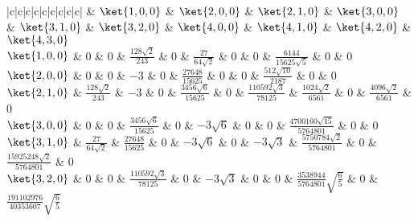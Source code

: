 

\begin{table}[ht]
\centering
\caption{$\mel{\psi_{n',l',m'}}{z}{\psi_{n,l,m}}$}\label{HDipM_tab1}
\begin{tabular}{|c|c|c|c|c|c|c|c|c|}
\hline
& $\ket{1,0,0}$ & $\ket{2,0,0}$ & $\ket{2,1,0}$ & $\ket{3,0,0}$ & $\ket{3,1,0}$ & $\ket{3,2,0}$ & $\ket{4,0,0}$ &  $\ket{4,1,0}$ & $\ket{4,2,0}$ & $\ket{4,3,0}$ \\
\hline
$\ket{1,0,0}$ & 0 & 0 & $\frac{128\sqrt 2}{243}$ & 0 & $\frac{27}{64\sqrt 2}$ & 0 & 0 & $\frac{6144}{15625 \sqrt 5}$ & 0 & 0\\
\hline
$\ket{2,0,0}$ & 0 & 0 & $-3$ & 0 & $\frac{27648}{15625}$ & 0 & 0 & $\frac{512\sqrt{10}}{2187}$ & 0 & 0 \\
\hline
$\ket{2,1,0}$ & $\frac{128\sqrt 2}{243}$ & $-3$ & 0 & $\frac{3456\sqrt 6}{15625}$ & 0 & $\frac{110592\sqrt 3}{78125}$ & $\frac{1024\sqrt 2}{6561}$ & 0 & $\frac{4096\sqrt 2}{6561}$ & 0\\
\hline
$\ket{3,0,0}$ & 0 & 0 & $\frac{3456\sqrt 6}{15625}$ & 0 & $-3\sqrt 6$ & 0 & 0 & $\frac{4700160 \sqrt{15}}{5764801}$ & 0 & 0\\
\hline
$\ket{3,1,0}$ & $\frac{27}{64\sqrt 2}$ & $\frac{27648}{15625}$ & 0 & $-3\sqrt 6$ & 0 & $-3 \sqrt 3$ & $\frac{5750784 \sqrt 2}{5764801}$ & 0 & $\frac{15925248 \sqrt 2}{5764801}$ & 0\\
\hline
$\ket{3,2,0}$ & 0 & 0 & $\frac{110592\sqrt 3}{78125}$ & 0 & $-3\sqrt 3$ & 0 & 0 & $\frac{3538944}{5764801}\sqrt{\frac 65}$ & 0 & $\frac{191102976}{40353607}\sqrt{\frac 65}$ \\
\hline
\end{tabular}
\end{table}
